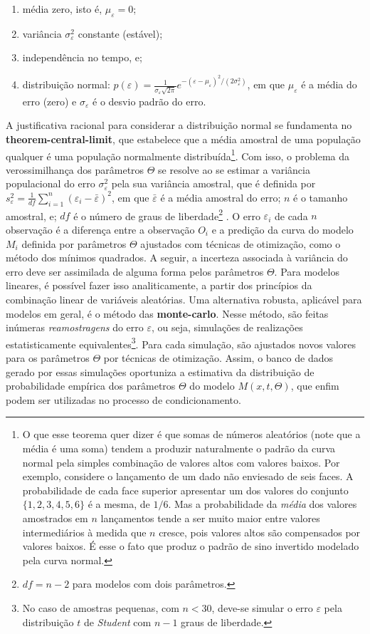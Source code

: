 \documentclass[./main.tex]{subfiles}
\begin{document}
\begin{enumerate}
    \item média zero, isto é, $\mu_{\varepsilon} = 0$;
    \item variância $\sigma_{\varepsilon}^2$ constante (estável);
    \item independência no tempo, e;
    \item distribuição normal: $p(\varepsilon) = \frac{1}{\sigma_{\varepsilon} \sqrt{2\pi}}e^{-(\varepsilon-\mu_{\varepsilon})^2/{(2\sigma_{\varepsilon}^2)}}$, em que $\mu_{\varepsilon}$ é a média do erro (zero) e $\sigma_{\varepsilon}$ é o desvio padrão do erro.
\end{enumerate}
A justificativa racional para considerar a distribuição normal se fundamenta no \textbf{\gls{theorem-central-limit}}, que estabelece que a média amostral de uma população qualquer é uma população normalmente distribuída\footnote{O que esse teorema quer dizer é que somas de números aleatórios (note que a média é uma soma) tendem a produzir naturalmente o padrão da curva normal pela simples combinação de valores altos com valores baixos. Por exemplo, considere o lançamento de um dado não enviesado de seis faces. A probabilidade de cada face superior apresentar um dos valores do conjunto $\{1, 2, 3, 4, 5, 6\}$ é a mesma, de $1/6$. Mas a probabilidade da \textit{média} dos valores amostrados em $n$ lançamentos tende a ser muito maior entre valores intermediários à medida que $n$ cresce, pois valores altos são compensados por valores baixos. É esse o fato que produz o padrão de sino invertido modelado pela curva normal.}. Com isso, o problema da verossimilhança dos parâmetros $\Theta$ se resolve ao se estimar a variância populacional do erro $\sigma^2_\varepsilon$ pela sua variância amostral, que é definida por $s^2_{\varepsilon} = \frac{1}{df}\sum_{i=1}^{n}({\varepsilon_i - \bar{\varepsilon}})^2$, em que $\bar{\varepsilon}$ é a média amostral do erro; $n$ é o tamanho amostral, e; $df$ é o número de graus de liberdade\footnote{$df = n-2$ para modelos com dois parâmetros.} \cite{graybill1994}. O erro $\varepsilon_i$ de cada $n$ observação é a diferença entre a observação $O_i$ e a predição da curva do modelo $M_i$ definida por parâmetros $\Theta$ ajustados com técnicas de otimização, como o método dos mínimos quadrados. A seguir, a incerteza associada à variância do erro deve ser assimilada de alguma forma pelos parâmetros $\Theta$. Para modelos lineares, é possível fazer isso analiticamente, a partir dos princípios da combinação linear de variáveis aleatórias. Uma alternativa robusta, aplicável para modelos em geral, é o método das \textbf{\gls{monte-carlo}}. Nesse método, são feitas inúmeras \textit{reamostragens} do erro $\varepsilon$, ou seja, simulações de realizações estatisticamente equivalentes\footnote{No caso de amostras pequenas, com $n < 30$, deve-se simular o erro $\varepsilon$ pela distribuição $t$ de \textit{Student} com $n-1$ graus de liberdade.}. Para cada simulação, são ajustados novos valores para os parâmetros $\Theta$ por técnicas de otimização. Assim, o banco de dados gerado por essas simulações oportuniza a estimativa da distribuição de probabilidade empírica dos parâmetros $\Theta$ do modelo $M(x, t, \Theta)$, que enfim podem ser utilizadas no processo de condicionamento. 
\end{document}
